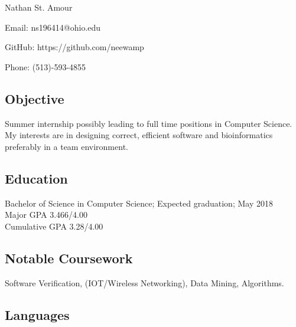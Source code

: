 \documentclass[11pt]{article} %
\newcommand{\name}[1]{
  \centerline{\Huge{#1}}
  }
\begin{document}
\thispagestyle{empty}
\name{Nathan St. Amour}
\begin{center}

 
 
\centerline{\large{Email: ns196414@ohio.edu}}
\centerline{GitHub: https://github.com/neewamp}
\centerline{\large{Phone: (513)-593-4855}}

\end{center}
\subsection*{Objective}
 Summer internship possibly leading to full time positions in Computer Science. My interests are in designing correct, efficient software and bioinformatics preferably in a team environment.
  \subsection*{Education}
  Bachelor of Science in Computer Science; Expected graduation; May 2018\\
  Major GPA   3.466/4.00 \\
Cumulative GPA   3.28/4.00


\subsection*{Notable Coursework}
Software Verification, (IOT/Wireless Networking), Data Mining,
Algorithms.
\subsection*{Languages}


\end{document}
